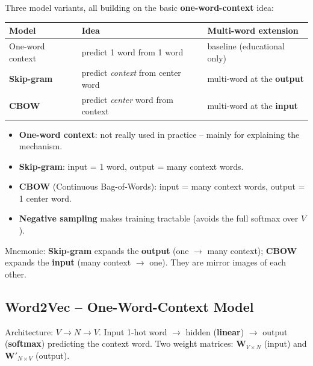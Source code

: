 \documentclass[10pt,a4paper]{article}
\begin{document}
	Three model variants, all building on the basic \textbf{one-word-context} idea:
	\begin{center}
	\begin{tabular}{lll}
		\toprule
		Model & Idea & Multi-word extension \\
		\midrule
		One-word context & predict 1 word from 1 word & baseline (educational only) \\
		\textbf{Skip-gram} & predict \emph{context} from center word & multi-word at the \textbf{output} \\
		\textbf{CBOW} & predict \emph{center} word from context & multi-word at the \textbf{input} \\
		\bottomrule
	\end{tabular}
	\end{center}

	\begin{itemize}[leftmargin=*]
		\item \textbf{One-word context}: not really used in practice -- mainly for explaining the mechanism.
		\item \textbf{Skip-gram}: input = 1 word, output = many context words.
		\item \textbf{CBOW} (Continuous Bag-of-Words): input = many context words, output = 1 center word.
		\item \textbf{Negative sampling} makes training tractable (avoids the full softmax over $V$).
	\end{itemize}

	\begin{importantbox}
		Mnemonic: \textbf{Skip-gram} expands the \textbf{output} (one $\to$ many context); \textbf{CBOW} expands the \textbf{input} (many context $\to$ one). They are mirror images of each other.
	\end{importantbox}

	\subsection{Word2Vec -- One-Word-Context Model}

	Architecture: $V \to N \to V$. Input 1-hot word $\to$ hidden (\textbf{linear}) $\to$ output (\textbf{softmax}) predicting the context word. Two weight matrices: $\mathbf{W}_{V\times N}$ (input) and $\mathbf{W}'_{N\times V}$ (output).
\end{document}
